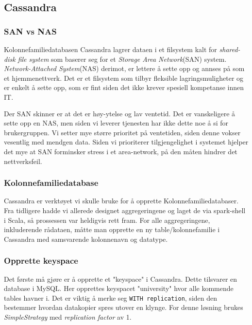\subsection{Cassandra}

\subsubsection{SAN vs NAS}
Kolonnefamiliedatabasen Cassandra lagrer dataen i et filsystem kalt for \textit{shared-disk file system} som baserer seg for et \textit{Storage Area Network}(SAN) system. \textit{Network-Attached System}(NAS) derimot, er lettere å sette opp og annses på som et hjemmenettverk. Det er et filsystem som tilbyr fleksible lagringsmuligheter og er enkelt å sette opp, som er fint siden det ikke krever spesiell kompetanse innen IT.

Der SAN skinner er at det er høy-ytelse og lav ventetid. Det er vanskeligere å sette opp en NAS, men siden vi leverer tjenesten har ikke dette noe å si for brukergruppen. Vi setter mye større prioritet på ventetiden, siden denne vokser vesentlig med mendgen data. Siden vi prioriterer tilgjengelighet i systemet hjelper det mye at SAN forminsker stress i et area-network, på den måten hindrer det nettverksfeil.

\subsubsection{Kolonnefamiliedatabase}
Cassandra er verktøyet vi skulle bruke for å opprette Kolonnefamiliedatabaser. Fra tidligere hadde vi allerede designet aggregeringene og laget de via spark-shell i Scala, så prossessen var heldigvis rett fram. For alle aggregeringene, inkluderende rådataen, måtte man opprette en ny table/kolonnefamilie i Cassandra med samsvarende kolonnenavn og datatype.

\subsubsection{Opprette keyspace}
Det første må gjøre er å opprette et "keyspace" i Cassandra. Dette tilsvarer en database i MySQL. Her opprettes keyspacet "university" hvor alle kommende tables havner i. Det er viktig å merke seg \lstinline{WITH replication}, siden den bestemmer hvordan datakopier spres utover en klynge. For denne løsning brukes \textit{SimpleStrategy} med \textit{replication factor} av 1. 


